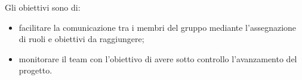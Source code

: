  Gli obiettivi sono di:
\begin{itemize}
	\item{facilitare la comunicazione tra i membri del gruppo mediante l'assegnazione di ruoli e obiettivi da raggiungere;}
	\item{monitorare il team con l'obiettivo di avere sotto controllo l'avanzamento del progetto.}
\end{itemize}